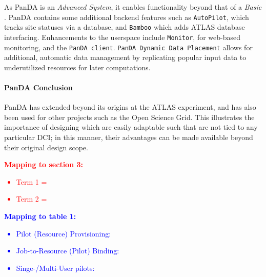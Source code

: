 \documentclass{sig-alternate}
\begin{document}
As PanDA is an \textit{Advanced \pilotjob System}, it enables functionality
beyond that of a \textit{Basic \pilotjob}.
PanDA contains some additional backend features such as \texttt{AutoPilot}, which
tracks site statuses via a database, and \texttt{Bamboo} which adds
ATLAS database interfacing.  Enhancements to the userspace include 
\texttt{Monitor}, for web-based monitoring, and the \texttt{PanDA client}.
\texttt{PanDA Dynamic Data Placement} \cite{maeno_pd2p:_2012} 
allows for additional, automatic data
management by replicating popular input data to underutilized resources
for later computations.

\paragraph{PanDA Conclusion}
PanDA has extended beyond its origins at the ATLAS experiment, and has also been used for other projects such
as the Open Science Grid.  This illustrates the importance of designing
\pilotjobs which are easily adaptable such that \pilots are not tied
to any particular DCI; in this manner, their advantages can be made
available beyond their original design scope.

\textcolor{red}
{
\textbf{Mapping to section 3:}
\begin{itemize}
\item Term 1 =
\item Term 2 =
\end{itemize}
}

\textcolor{blue}
{
\textbf{Mapping to table 1:}
\begin{itemize}
\item Pilot (Resource) Provisioning:
\item Job-to-Resource (Pilot) Binding:
\item Singe-/Multi-User pilots:
\end{itemize}
}



\end{document}
